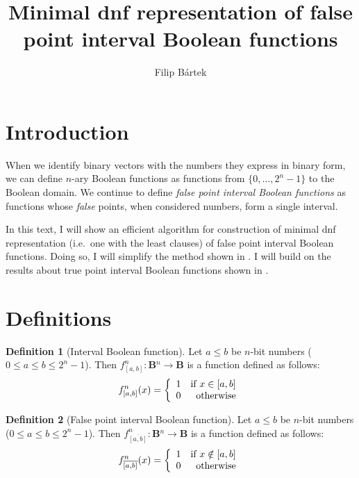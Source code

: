 \documentclass{article}
\author{Filip Bártek}
\title{Minimal \acrshort{dnf} representation of false point interval Boolean functions}
\theoremstyle{plain}
\theoremstyle{definition}
\newtheorem{definition}{Definition}[section]
\newcommand{\interval}[2]{[#1, #2]}
\newcommand{\finterval}[2]{\overline{\interval{#1}{#2}}}
\newcommand{\booldom}{\mathbf{B}} %
\begin{document}
\maketitle

\section{Introduction}
When we identify binary vectors with the numbers they express in binary form,
we can define $n$-ary Boolean functions
as functions from $\{0, \ldots, 2^n - 1\}$ to the Boolean domain.
We continue to define \emph{false point interval Boolean functions}
as functions whose \emph{false} points,
when considered numbers,
form a single interval.

In this text,
I will show an efficient algorithm
for construction of minimal \acrshort{dnf} representation
(i.e.~one with the least clauses)
of false point interval Boolean functions.
Doing so, I will simplify the method shown in \cite{Dubovsky2012}.
I will build on the results about true point interval Boolean functions
shown in \cite{Schieber2005154}.

\section{Definitions}
\begin{definition}[Interval Boolean function]
Let $a \leq b$ be $n$-bit numbers ($0 \leq a \leq b \leq 2^n - 1$).
Then $f^n_{\interval{a}{b}}: \booldom{}^n \rightarrow \booldom{}$ is a function defined as follows:
\[f^n_{\interval{a}{b}} (x) = \left\{
  \begin{array}{lr}
    1 & $if $ x \in \interval{a}{b}\\
    0 & $otherwise$
  \end{array}
\right.
\]
\end{definition}

\begin{definition}[False point interval Boolean function]
Let $a \leq b$ be $n$-bit numbers ($0 \leq a \leq b \leq 2^n - 1$).
Then $f^n_{\finterval{a}{b}}: \booldom{}^n \rightarrow \booldom{}$ is a function defined as follows:
\[f^n_{\finterval{a}{b}} (x) = \left\{
  \begin{array}{lr}
    1 & $if $ x \notin \interval{a}{b}\\
    0 & $otherwise$
  \end{array}
\right.
\]
\end{definition}
\end{document}
